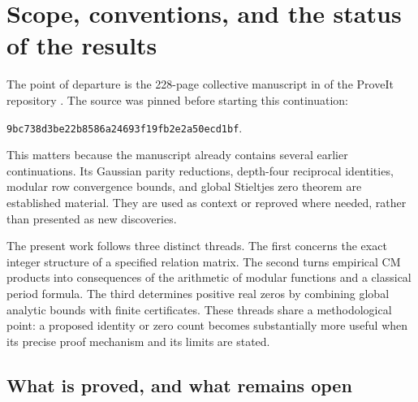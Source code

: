 \section{Scope, conventions, and the status of the results}
\label{sec:scope}

The point of departure is the 228-page collective manuscript in
 of the ProveIt repository
\cite{ProveIt}. The source was pinned before starting this continuation:
\begin{center}
\small\texttt{9bc738d3be22b8586a24693f19fb2e2a50ecd1bf}.
\end{center}
This matters because the manuscript already contains several earlier
continuations. Its Gaussian parity reductions, depth-four reciprocal
identities, modular row convergence bounds, and global Stieltjes zero
theorem are established material. They are used as context or reproved
where needed, rather than presented as new discoveries.

The present work follows three distinct threads. The first concerns the
exact integer structure of a specified relation matrix. The second turns
empirical CM products into consequences of the arithmetic of modular
functions and a classical period formula. The third determines positive
real zeros by combining global analytic bounds with finite certificates.
These threads share a methodological point: a proposed identity or zero
count becomes substantially more useful when its precise proof mechanism
and its limits are stated.

\subsection{What is proved, and what remains open}

